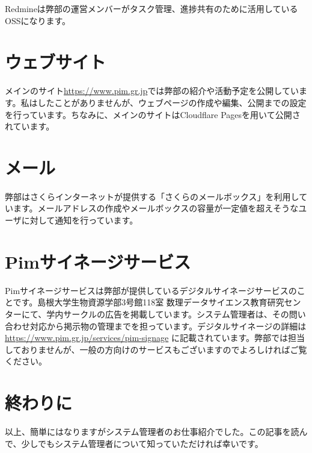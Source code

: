 \documentclass[a4paper,11pt]{jsarticle}
\begin{document}
Redmineは弊部の運営メンバーがタスク管理、進捗共有のために活用しているOSSになります。

\section{ウェブサイト}
メインのサイト\url{https://www.pim.gr.jp}では弊部の紹介や活動予定を公開しています。私はしたことがありませんが、ウェブページの作成や編集、公開までの設定を行っています。ちなみに、メインのサイトはCloudflare Pagesを用いて公開されています。

\section{メール}
弊部はさくらインターネットが提供する「さくらのメールボックス」を利用しています。メールアドレスの作成やメールボックスの容量が一定値を超えそうなユーザに対して通知を行っています。

\section{Pimサイネージサービス}
Pimサイネージサービスは弊部が提供しているデジタルサイネージサービスのことです。島根大学生物資源学部3号館118室 数理データサイエンス教育研究センターにて、学内サークルの広告を掲載しています。システム管理者は、その問い合わせ対応から掲示物の管理までを担っています。デジタルサイネージの詳細は \url{https://www.pim.gr.jp/services/pim-signage} に記載されています。弊部では担当しておりませんが、一般の方向けのサービスもございますのでよろしければご覧ください。

\section{終わりに}
以上、簡単にはなりますがシステム管理者のお仕事紹介でした。この記事を読んで、少しでもシステム管理者について知っていただければ幸いです。
\end{document}
